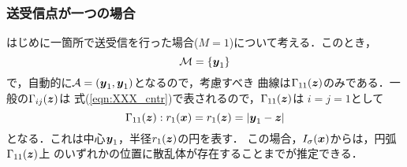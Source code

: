 \subsubsection{送受信点が一つの場合}
はじめに一箇所で送受信を行った場合($M=1$)について考える．このとき，
\begin{equation}
	{\cal M} =\left\{ 
		\mbox{\boldmath $y$}_1
	\right\}
	\label{eqn:XXX_M1}
\end{equation}
で，自動的に${\cal A}={(\mbox{\boldmath $y$}_1,\mbox{\boldmath $y$}_1)}$となるので，考慮すべき
曲線は$\Gamma_{11}(\mbox{\boldmath $z$})$のみである．一般の$\Gamma_{ij}(\mbox{\boldmath $z$})$は
式(\ref{eqn:XXX_cntr})で表されるので，$\Gamma_{11}(\mbox{\boldmath $z$})$は
$i=j=1$として
\begin{equation}
	\Gamma_{11}(\mbox{\boldmath $z$}): 
	r_{1}(\mbox{\boldmath $x$})=r_{1}(\mbox{\boldmath $z$})=\left| \mbox{\boldmath $y$}_1-\mbox{\boldmath $z$} \right|
	\label{eqn:XXX_Gmm11}
\end{equation}
となる．これは中心$\mbox{\boldmath $y$}_1$，半径$r_1(\mbox{\boldmath $z$})$の円を表す．
この場合，$I_\sigma(\mbox{\boldmath $x$})$からは，円弧$\Gamma_{11}(\mbox{\boldmath $z$})$上
のいずれかの位置に散乱体が存在することまでが推定できる．
